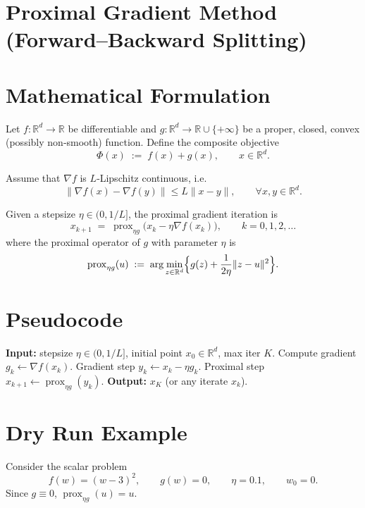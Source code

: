 \documentclass{article}
\newcommand{\prox}{\operatorname{prox}}
\newcommand{\R}{\mathbb{R}}
\begin{document}
\section*{Proximal Gradient Method (Forward–Backward Splitting)}

\section*{Mathematical Formulation}
Let $f:\R^{d}\rightarrow\R$ be differentiable and $g:\R^{d}\rightarrow\R\cup\{+\infty\}$ be a proper, closed, convex (possibly non‑smooth) function.  
Define the composite objective
\[
\Phi(x)\;:=\;f(x)+g(x),\qquad x\in\R^{d}.
\]

Assume that $\nabla f$ is $L$‑Lipschitz continuous, i.e.
\[
\|\nabla f(x)-\nabla f(y)\|\le L\|x-y\|,\qquad\forall x,y\in\R^{d}.
\]

Given a stepsize $\eta\in(0,1/L]$, the proximal gradient iteration is
\begin{equation}
\label{eq:pg}
x_{k+1}\;=\;\prox_{\eta g}\!\bigl(x_{k}-\eta \nabla f(x_{k})\bigr),\qquad k=0,1,2,\dots
\end{equation}
where the proximal operator of $g$ with parameter $\eta$ is
\[
\prox_{\eta g}(u)\;:=\;\arg\min_{z\in\R^{d}}\Bigl\{ g(z)+\frac{1}{2\eta}\|z-u\|^{2}\Bigr\}.
\]

\section*{Pseudocode}
\begin{algorithm}[H]
\caption{Proximal Gradient Method}
\begin{algorithmic}[1]
\STATE \textbf{Input:} stepsize $\eta\in(0,1/L]$, initial point $x_{0}\in\R^{d}$, max iter $K$.
    \STATE Compute gradient $g_{k}\gets \nabla f(x_{k})$.
    \STATE Gradient step $y_{k}\gets x_{k}-\eta g_{k}$.
    \STATE Proximal step $x_{k+1}\gets \prox_{\eta g}(y_{k})$.
\ENDFOR
\STATE \textbf{Output:} $x_{K}$ (or any iterate $x_{k}$).
\end{algorithmic}
\end{algorithm}

\section*{Dry Run Example}
Consider the scalar problem
\[
f(w)=(w-3)^{2},\qquad g(w)=0,\qquad \eta=0.1,\qquad w_{0}=0.
\]
Since $g\equiv0$, $\prox_{\eta g}(u)=u$.
\end{document}
